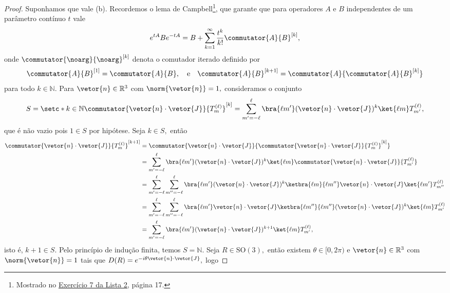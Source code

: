 \begin{proof}
   Suponhamos que vale (b). Recordemos o lema de Campbell\footnote{Mostrado no \href{https://github.com/louisradial/4305001-mecanica-quantica/releases/tag/lista2}{Exercício 7 da Lista 2,} página 17.}, que garante que para operadores \(A\) e \(B\) independentes de um parâmetro contínuo \(t\) vale
   \begin{equation*}
      e^{tA}Be^{-tA} = B + \sum_{k = 1}^\infty{\frac{t^k}{k!} \commutator{A}{B}^{[k]}},
   \end{equation*}
   onde \(\commutator{\noarg}{\noarg}^{[k]}\) denota o comutador iterado definido por 
   \begin{equation*}
      \commutator{A}{B}^{[1]} = \commutator{A}{B}, \quad\text{e}\quad
      \commutator{A}{B}^{[k+1]} = \commutator{A}{\commutator{A}{B}^{[k]}}
   \end{equation*}
   para todo \(k \in \mathbb{N}.\) Para \(\vetor{n} \in \mathbb{R}^3\) com \(\norm{\vetor{n}} = 1,\) consideramos o conjunto
   \begin{equation*}
      S = \setc*{k \in \mathbb{N}}{\commutator{\vetor{n}\cdot \vetor{J}}{T^{(\ell)}_m}^{[k]} = \sum_{m' = -\ell}^{\ell}{\bra{\ell m'}(\vetor{n}\cdot \vetor{J})^k\ket{\ell m} T^{(\ell)}_{m'}}},
   \end{equation*}
   que é não vazio pois \(1 \in S\) por hipótese. Seja \(k \in S,\) então
   \begin{align*}
      \commutator{\vetor{n}\cdot\vetor{J}}{T^{(\ell)}_m}^{[k + 1]} 
      &= \commutator{\vetor{n}\cdot\vetor{J}}{\commutator{\vetor{n}\cdot \vetor{J}}{T^{(\ell)}_m}^{[k]}}\\
      &= \sum_{m' = -\ell}^{\ell}{\bra{\ell m'}(\vetor{n}\cdot\vetor{J})^k\ket{\ell m} \commutator{\vetor{n}\cdot\vetor{J}}{T^{(\ell)}_{m'}}}\\
      &= \sum_{m' = - \ell}^{\ell}{\sum_{m'' = -\ell}^{\ell}{\bra{\ell m'}(\vetor{n}\cdot\vetor{J})^k\ketbra{\ell m}{\ell m''}\vetor{n}\cdot\vetor{J}\ket{\ell m'} T^{(\ell)}_{m''}}}\\
      &= \sum_{m' = - \ell}^{\ell}{\sum_{m'' = -\ell}^{\ell}{ \bra{\ell m'}\vetor{n}\cdot\vetor{J}\ketbra{\ell m''}{\ell m''} (\vetor{n}\cdot\vetor{J})^k \ket{\ell m}T^{(\ell)}_{m'}}}\\
      &= \sum_{m' = -\ell}^{\ell}{\bra{\ell m'}(\vetor{n}\cdot \vetor{J})^{k+1}\ket{\ell m} T^{(\ell)}_{m'}},
   \end{align*}
   isto é, \(k + 1 \in S.\) Pelo princípio de indução finita, temos \(S = \mathbb{N}.\) Seja \(R \in \mathrm{SO}(3),\) então existem \(\theta \in [0,2\pi)\) e \(\vetor{n}\in \mathbb{R}^3\) com \(\norm{\vetor{n}} = 1\) tais que \(D(R) = e^{-i\theta\vetor{n}\cdot \vetor{J}},\) logo

\end{proof}
